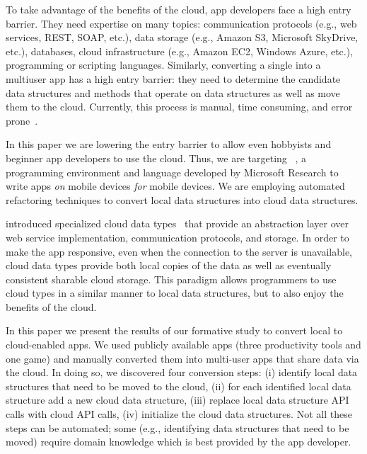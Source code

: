 \documentclass[preprint]{sigplanconf}
\begin{document}
To take advantage of the benefits of the cloud, app developers face a high entry barrier. They need expertise on many topics: communication protocols (e.g., web services, REST, SOAP, etc.), data storage (e.g., Amazon S3, Microsoft SkyDrive, etc.), databases, cloud infrastructure (e.g., Amazon EC2, Windows Azure, etc.),  programming or scripting languages. Similarly, converting a single into a multiuser app has a high entry barrier: they need to determine the candidate data structures and methods that operate on data structures as well as move them to the cloud. Currently, this process is manual, time consuming, and error prone~\cite{khan2013survey}.

In this paper we are lowering the entry barrier to allow even hobbyists and beginner app developers to use the cloud. Thus, we are targeting \TD~\cite{Tillmann2011TPC20482372048245}, a programming environment and language developed by Microsoft Research to write apps \emph{on} mobile devices \emph{for} mobile devices. We are employing automated refactoring techniques to convert local data structures into cloud data structures.

\TD introduced specialized cloud data types~\cite{burckhardt2012cloud} that provide an abstraction layer over web service implementation, communication protocols, and storage.  In order to make the app responsive, even when the connection to the server is unavailable, cloud data types provide both local copies of the data as well as eventually consistent sharable cloud storage. This paradigm allows programmers to use cloud types in a similar manner to local data structures, but to also enjoy the benefits of the cloud.

In this paper we present the results of our formative study to convert local to cloud-enabled apps. We used \numFormative publicly available \TD apps (three productivity tools and one game) and manually converted them into multi-user apps that share data via the cloud. In doing so, we discovered four conversion steps: (i) identify local data structures that need to be moved to the cloud, (ii) for each identified local data structure add a new cloud data structure, (iii) replace local data structure API calls with cloud API calls, (iv) initialize the cloud data structures. Not all these steps can be automated; some (e.g., identifying data structures that need to be moved) require domain knowledge which is best provided by the app developer. 
\end{document}
